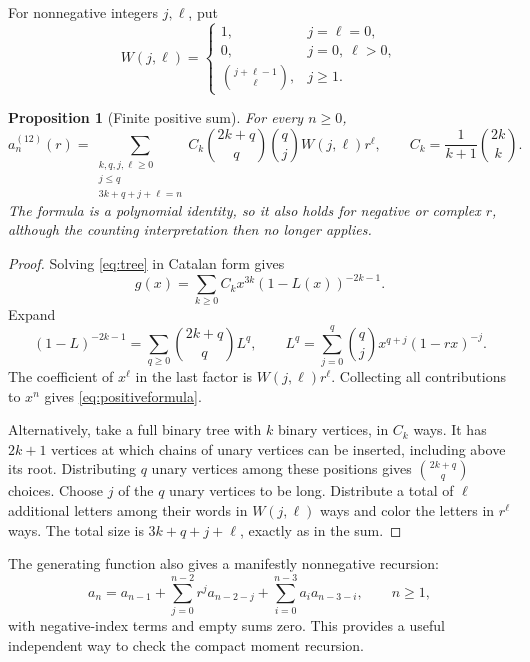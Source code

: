 \documentclass[11pt,letterpaper]{article}
\numberwithin{equation}{section}
\newtheorem{proposition}[theorem]{Proposition}
\theoremstyle{definition}
\begin{document}
For nonnegative integers \(j,\ell\), put
\begin{equation}
 W(j,\ell)=
 \begin{cases}
 1,&j=\ell=0,\\
 0,&j=0,\ \ell>0,\\
 \displaystyle\binom{j+\ell-1}{\ell},&j\geq1.
 \end{cases}
 \label{eq:W}
\end{equation}

\begin{proposition}[Finite positive sum]
\label{prop:coeff}
For every \(n\geq0\),
\begin{equation}
 a_n^{(12)}(r)=
 \sum_{\substack{k,q,j,\ell\geq0\\j\leq q\\3k+q+j+\ell=n}}
 C_k\binom{2k+q}{q}\binom qj W(j,\ell)r^\ell,
 \qquad C_k=\frac1{k+1}\binom{2k}{k}.
 \label{eq:positiveformula}
\end{equation}
The formula is a polynomial identity, so it also holds for negative or
complex \(r\), although the counting interpretation then no longer applies.
\end{proposition}
\begin{proof}
Solving \eqref{eq:tree} in Catalan form gives
\begin{equation}
 g(x)=\sum_{k\geq0}C_kx^{3k}(1-L(x))^{-2k-1}.
\end{equation}
Expand
\begin{equation}
 (1-L)^{-2k-1}=\sum_{q\geq0}\binom{2k+q}{q}L^q,
 \qquad
 L^q=\sum_{j=0}^q\binom qj x^{q+j}(1-rx)^{-j}.
\end{equation}
The coefficient of \(x^\ell\) in the last factor is
\(W(j,\ell)r^\ell\). Collecting all contributions to \(x^n\) gives
\eqref{eq:positiveformula}.

Alternatively, take a full binary tree with \(k\) binary vertices, in
\(C_k\) ways. It has \(2k+1\) vertices at which chains of unary vertices
can be inserted, including above its root. Distributing \(q\) unary
vertices among these positions gives \(\binom{2k+q}{q}\) choices.
Choose \(j\) of the \(q\) unary vertices to be long. Distribute a total of
\(\ell\) additional letters among their words in \(W(j,\ell)\) ways and
color the letters in \(r^\ell\) ways. The total size is
\(3k+q+j+\ell\), exactly as in the sum.
\end{proof}

The generating function also gives a manifestly nonnegative recursion:
\begin{equation}
 a_n=a_{n-1}+\sum_{j=0}^{n-2}r^ja_{n-2-j}
                    +\sum_{i=0}^{n-3}a_ia_{n-3-i},\qquad n\geq1,
 \label{eq:positiverec}
\end{equation}
with negative-index terms and empty sums zero. This provides a useful
independent way to check the compact moment recursion.
\end{document}
